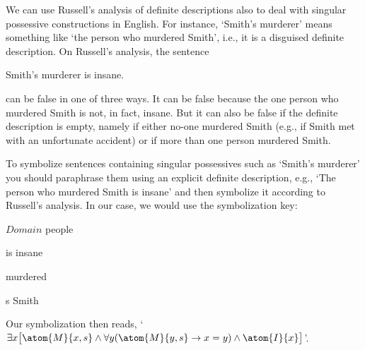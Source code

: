 We can use Russell's analysis of definite descriptions also to deal with singular possessive constructions in English.  For instance, `Smith's murderer' means something like `the person who murdered Smith', i.e., it is a disguised definite description.  On Russell's analysis, the sentence
\begin{earg}
	\item[\ex{smithsmurder}] Smith's murderer is insane.
\end{earg}
can be false in one of three ways. It can be false because the one person who murdered Smith is not, in fact, insane. But it can also be false if the definite description is empty, namely if either no-one murdered Smith (e.g., if Smith met with an unfortunate accident) or if more than one person murdered Smith.

To symbolize sentences containing singular possessives such as `Smith's murderer' you should paraphrase them using an explicit definite description, e.g., `The person who murdered Smith is insane' and then symbolize it according to Russell's analysis. In our case, we would use the symbolization key:
\begin{ekey}
	\item[$Domain$] people
	\item[\atom{I}{x}]  is insane 
	\item[\atom{M}{x,y}]  murdered 
	\item[s] Smith 
\end{ekey}
Our symbolization then reads, `$\exists x\bigl[\atom{M}{x,s} \eand \forall y(\atom{M}{y,s} \eif x=y) \eand \atom{I}{x}\bigr]$'.

